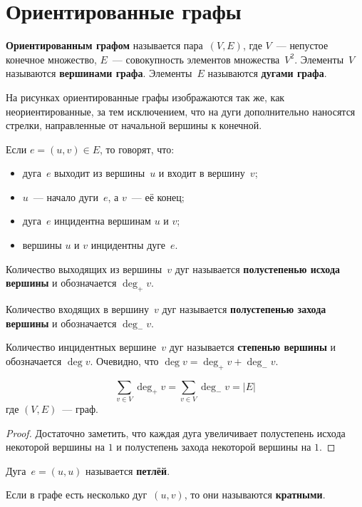 \section{Ориентированные графы}
 \textbf{Ориентированным графом} называется пара~$(V, E)$, где $V$~--- непустое конечное множество, $E$~--- совокупность элементов множества~$V^2$.
Элементы~$V$ называются \textbf{вершинами графа}.
Элементы~$E$ называются \textbf{дугами графа}.

На рисунках ориентированные графы изображаются так же, как неориентированные, за тем исключением, что на дуги дополнительно наносятся стрелки, направленные от начальной вершины к конечной.

Если $e = (u, v) \in E$, то говорят, что:
\begin{itemize}
	\item дуга~$e$ выходит из вершины~$u$ и входит в вершину~$v$;
	\item $u$~--- начало дуги~$e$, а $v$~--- её конец;
	\item дуга~$e$ инцидентна вершинам $u$ и $v$;
	\item вершины $u$ и $v$ инцидентны дуге~$e$.
\end{itemize}

 Количество выходящих из вершины~$v$ дуг называется \textbf{полустепенью исхода вершины} и обозначается $\deg_+ v$.

Количество входящих в вершину~$v$ дуг называется \textbf{полустепенью захода вершины} и обозначается $\deg_- v$.

Количество инцидентных вершине~$v$ дуг называется \textbf{степенью вершины} и обозначается $\deg v$.
Очевидно, что $\deg v = \deg_+ v + \deg_- v$.

\begin{statement}
\begin{equation*}
\sum_{v \in V} \deg_+ v = \sum_{v \in V} \deg_- v = |E|
\end{equation*}
где $(V, E)$~--- граф.
\end{statement}
\begin{proof}
Достаточно заметить, что каждая дуга увеличивает полустепень исхода некоторой вершины на $1$ и полустепень захода некоторой вершины на $1$.
\end{proof}

 Дуга~$e = (u, u)$ называется \textbf{петлёй}.

Если в графе есть несколько дуг~$(u, v)$, то они называются \textbf{кратными}.

